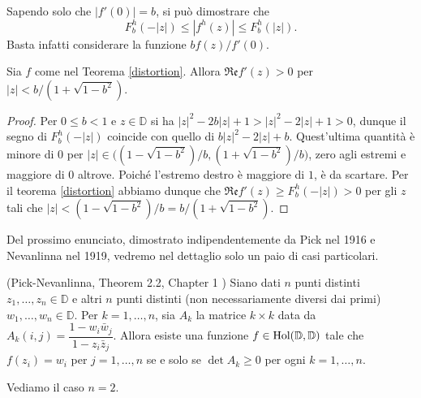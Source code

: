 \begin{oss}
  Sapendo solo che $|f'(0)|=b$, si può dimostrare che
  $$F_b^h(-|z|) \le |f^h(z)| \le F_b^h(|z|).$$
  Basta infatti considerare la funzione $bf(z)/f'(0)$.
\end{oss}

\begin{cor} \label{distorto}
  Sia $f$ come nel Teorema \ref{distortion}. Allora $\mathfrak{Re}f'(z)>0$ per $|z|<b/(1+\sqrt{1-b^2})$.
\end{cor}

\begin{proof}
  Per $0 \le b<1$ e $z \in \mathbb{D}$ si ha $|z|^2-2b|z|+1>|z|^2-2|z|+1>0$, dunque il segno di $F_b^h(-|z|)$ coincide con quello di $b|z|^2-2|z|+b$. Quest'ultima quantità è minore di $0$ per $|z| \in \bigl((1-\sqrt{1-b^2})/b, (1+\sqrt{1-b^2})/b\bigr)$, zero agli estremi e maggiore di $0$ altrove. Poiché l'estremo destro è maggiore di $1$, è da scartare.
  Per il teorema \ref{distortion} abbiamo dunque che $\mathfrak{Re}f'(z) \ge F_b^h(-|z|)>0$ per gli $z$ tali che $|z|<(1-\sqrt{1-b^2})/b=b/(1+\sqrt{1-b^2})$.
\end{proof}

Del prossimo enunciato, dimostrato indipendentemente da Pick nel 1916 e Nevanlinna nel 1919, vedremo nel dettaglio solo un paio di casi particolari.

\begin{thm}
  (Pick-Nevanlinna, Theorem 2.2, Chapter 1 \cite{JBG}) Siano dati $n$ punti distinti $z_1, \dots, z_n \in \mathbb{D}$ e altri $n$ punti distinti (non necessariamente diversi dai primi) $w_1, \dots, w_n \in \mathbb{D}$. Per $k=1, \dots, n$, sia $A_k$ la matrice $k \times k$ data da $A_k(i,j)=\dfrac{1-w_i\bar{w}_j}{1-z_i\bar{z}_j}$.
  Allora esiste una funzione $f \in \normalfont{\text{Hol}}(\mathbb{D},\mathbb{D})$ tale che $f(z_i)=w_i$ per $j=1, \dots, n$ se e solo se $\det{A_k} \ge 0$ per ogni $k=1, \dots, n$.
\end{thm}

Vediamo il caso $n=2$.

